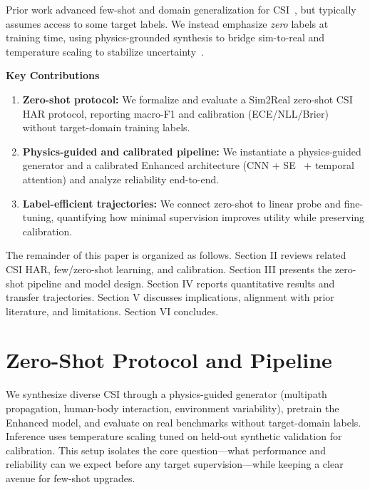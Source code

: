 \documentclass[journal]{IEEEtran}
\begin{document}
Prior work advanced few-shot and domain generalization for CSI~\cite{fewsense2022,airfi2022}, but typically assumes access to some target labels. We instead emphasize \emph{zero} labels at training time, using physics-grounded synthesis to bridge sim-to-real and temperature scaling to stabilize uncertainty~\cite{calibration_guo2017}.

\textbf{Key Contributions}
\begin{enumerate}
  \item \textbf{Zero-shot protocol:} We formalize and evaluate a Sim2Real zero-shot CSI HAR protocol, reporting macro-F1 and calibration (ECE/NLL/Brier) without target-domain training labels.
  \item \textbf{Physics-guided and calibrated pipeline:} We instantiate a physics-guided generator and a calibrated Enhanced architecture (CNN + SE~\cite{se_networks2018} + temporal attention) and analyze reliability end-to-end.
  \item \textbf{Label-efficient trajectories:} We connect zero-shot to linear probe and fine-tuning, quantifying how minimal supervision improves utility while preserving calibration.
\end{enumerate}

The remainder of this paper is organized as follows. Section II reviews related CSI HAR, few/zero-shot learning, and calibration. Section III presents the zero-shot pipeline and model design. Section IV reports quantitative results and transfer trajectories. Section V discusses implications, alignment with prior literature, and limitations. Section VI concludes.

\section{Zero-Shot Protocol and Pipeline}
We synthesize diverse CSI through a physics-guided generator (multipath propagation, human-body interaction, environment variability), pretrain the Enhanced model, and evaluate on real benchmarks without target-domain labels. Inference uses temperature scaling tuned on held-out synthetic validation for calibration. This setup isolates the core question—what performance and reliability can we expect before any target supervision—while keeping a clear avenue for few-shot upgrades.
\end{document}
